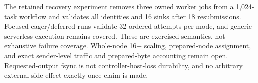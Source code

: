 The retained recovery experiment removes three owned worker jobs from a
1,024-task workflow and validates all identities and 16 sinks after 18
resubmissions. Focused eager/deferred runs validate 32 ordered attempts per
mode, and generic serverless execution remains covered. These are exercised
semantics, not exhaustive failure coverage. Whole-node 16+ scaling,
prepared-node assignment, and exact sender-level traffic and prepared-byte
accounting remain open. Requested-output fsync is not controller-host-loss
durability, and no arbitrary external-side-effect exactly-once claim is made.
